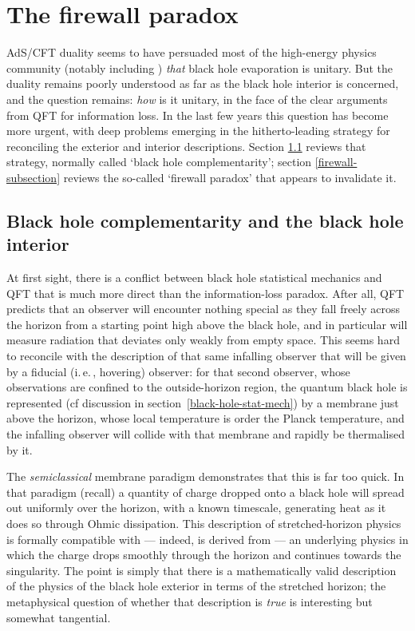 \documentclass[12pt]{article}
\newcommand{\iec}{\mbox{i.\,e.\,}}
\begin{document}
\section{The firewall paradox}\label{firewall}

AdS/CFT duality seems to have persuaded most of the high-energy physics community (notably including ) \emph{that} black hole evaporation is unitary. But the duality remains poorly understood as far as the black hole interior is concerned, and the question remains: \emph{how} is it unitary, in the face of the clear arguments from QFT for information loss. In the last few years this question has become more urgent, with deep problems emerging in the hitherto-leading strategy for reconciling the exterior and interior descriptions. Section \ref{complementarity} reviews that strategy, normally called `black hole complementarity'; section \ref{firewall-subsection} reviews the so-called `firewall paradox' that appears to invalidate it.

\subsection{Black hole complementarity and the black hole interior}\label{complementarity}

At first sight, there is a conflict between black hole statistical mechanics and QFT that is much more direct than the information-loss paradox.  After all, QFT predicts that an observer will encounter nothing special as they fall freely across the horizon from a starting point high above the black hole, and in particular will measure radiation that deviates only weakly from empty space. This seems hard to reconcile with the description of that same infalling observer that will be given by a fiducial (\iec, hovering) observer: for that second observer, whose observations are confined to the outside-horizon region, the quantum black hole is represented (cf discussion in section~\ref{black-hole-stat-mech}) by a membrane just above the horizon, whose local temperature is order the Planck temperature, and the infalling observer will collide with that membrane and  rapidly be thermalised by it.

The \emph{semiclassical} membrane paradigm demonstrates that this is far too quick. In that paradigm (recall) a quantity of charge dropped onto a black hole will spread out uniformly over the horizon, with a known timescale, generating heat as it does so through Ohmic dissipation. This description of stretched-horizon physics is formally compatible with --- indeed, is derived from --- an underlying physics in which the charge drops smoothly through the horizon and continues towards the singularity. The point is simply that there is a mathematically valid description of the physics of the black hole exterior in terms of the stretched horizon; the metaphysical question of whether that description is \emph{true} is interesting but somewhat tangential.
\end{document}
